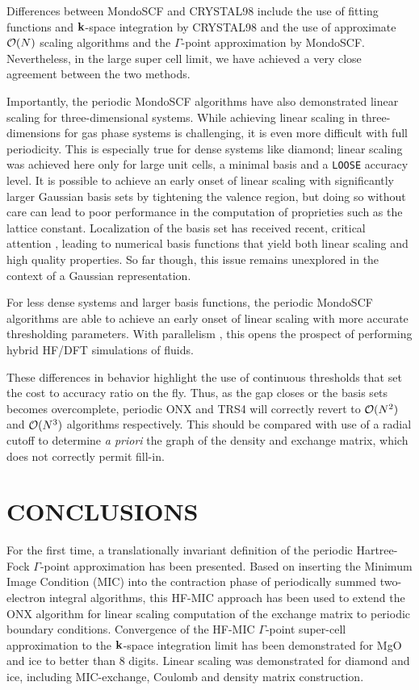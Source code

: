 \documentclass[prb,aps,nobibnotes,twocolumn,doublespace,twocolumngrid,superbib,showpacs]{revtex4}
\begin{document}
Differences between {\sc MondoSCF} and {\sc CRYSTAL98} include the use of fitting functions and $\bf k$-space 
integration by {\sc CRYSTAL98} and the use of approximate ${\cal O}(N)$ scaling algorithms and the 
$\Gamma$-point approximation by {\sc MondoSCF}.  Nevertheless, in the large super cell limit, we have achieved a 
very close agreement between the two methods.   

Importantly, the periodic {\sc MondoSCF} algorithms have also 
demonstrated linear scaling for three-dimensional systems.  While 
achieving linear scaling in three-dimensions for gas phase systems is challenging, 
it is even more difficult with full periodicity.  This is especially true for
dense systems like diamond;  linear scaling was achieved here only for large unit cells, 
a minimal basis and a {\tt LOOSE} accuracy level.  It is possible to achieve
an early onset of linear scaling with significantly larger Gaussian basis sets by 
tightening the valence region, but doing so without care can lead to  poor 
performance in the computation of proprieties such as the lattice constant.  
Localization of the  basis set  has received recent, critical attention \cite{SKenny00,JJunquera01,EAnglada02},
leading to numerical  basis functions that yield both linear scaling and high quality properties.  So far though,
this issue remains unexplored in the context of a Gaussian representation.

For less dense systems and larger basis functions, the periodic {\sc MondoSCF} algorithms 
are able to achieve an early onset of linear scaling with more accurate thresholding parameters.
With parallelism \cite{MChallacombe00B,CGan03,CGan04B}, this opens the prospect of performing hybrid HF/DFT simulations of fluids. 

These differences in behavior highlight the use of continuous thresholds that set the cost 
to accuracy ratio on the fly.  Thus, as the gap closes or the basis sets becomes overcomplete,  
periodic {\sc ONX} and {\sc TRS4} will correctly revert to ${\cal O}(N^2)$ and ${\cal O}(N^3)$ algorithms 
respectively.  This should be compared with  use of a radial cutoff to determine
{\em a priori } the  graph of the density and exchange matrix, which does not correctly  
permit fill-in.

\section{CONCLUSIONS}\label{conclusions}

For the first time, a translationally invariant definition of the periodic 
Hartree-Fock $\Gamma$-point approximation has been presented.  Based on inserting 
the Minimum Image Condition (MIC) into the contraction phase of periodically
summed two-electron integral algorithms,   this HF-MIC approach has been used 
to extend the {\sc ONX} algorithm for linear scaling computation of the exchange 
matrix to periodic boundary conditions.  Convergence of the HF-MIC $\Gamma$-point
super-cell approximation to the ${\bf k}$-space integration limit has been 
demonstrated for MgO and ice to better than 8 digits.  Linear scaling was 
demonstrated for diamond and ice, including MIC-exchange, Coulomb and density matrix 
construction.   
\end{document}
